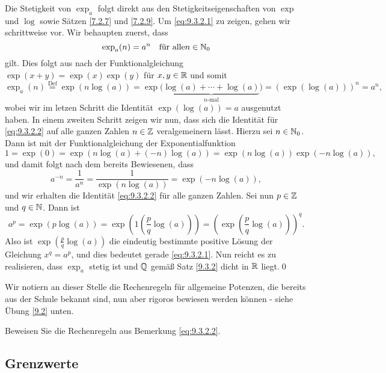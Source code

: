 \begin{subproof}[\ref{9.3.2}]
	Die Stetigkeit von $ \exp_a $ folgt direkt aus den Stetigkeitseigenschaften von $ \exp  $ und $ \log  $ sowie Sätzen \ref{7.2.7} und \ref{7.2.9}. Um \eqref{eq:9.3.2.1} zu zeigen, gehen wir schrittweise vor. Wir behaupten zuerst, dass
	\begin{equation}
		\label{eq:9.3.2.2}
		\exp_a(n) = a^n \quad \text{für alle} n \in \mathbb{N}_0
	\end{equation}
	gilt. Dies folgt aus nach der Funktionalgleichung $ \exp(x + y) = \exp(x) \exp (y) $ für $ x, y \in \mathbb{R}  $ und somit
	\[
		\exp_a(n) \overset{\text{Def}}{=}\exp (n \log (a)) = \exp \big( \underbrace{\log (a) + \dotsb + \log (a)}_{n\text{-mal} } \big) = \left( \exp (\log (a)) \right)^n = a^n,
	\]
	wobei wir im letzen Schritt die Identität $ \exp (\log (a)) = a $ ausgenutzt haben. In einem zweiten Schritt zeigen wir nun, dass sich die Identität für \eqref{eq:9.3.2.2} auf alle ganzen Zahlen $ n \in \mathbb{Z}  $ veralgemeinern lässt. Hierzu sei $ n \in \mathbb{N}_0 $. Dann ist mit der Funktionalgleichung der Exponentialfunktion
	\[
		1 = \exp (0) = \exp ( n \log (a) + (-n) \log (a)) = \exp (n\log (a))\exp (-n\log (a)),
	\]
	und damit folgt nach dem bereits Bewiesenen, dass
	\[
		a^{-n} = \frac{ 1 }{ a^{n}  } = \frac{ 1 }{ \exp (n \log (a)) } = \exp (-n\log (a)),
	\]
	und wir erhalten die Identität \eqref{eq:9.3.2.2} für alle ganzen Zahlen. Sei nun $ p \in \mathbb{Z} $ und $ q \in \mathbb{N}  $. Dann ist
	\[
		a^p =\exp \left( p \log (a) \right) = \exp \left( 1 \left( \frac{ p }{ q } \log (a) \right) \right) = \left( \exp \left( \frac{ p }{ q } \log (a) \right) \right)^q.
	\]
	Also ist $ \exp \left( \frac{ p }{ q } \log (a) \right)  $ die eindeutig bestimmte positive Lösung der Gleichung $ x^q = a^p $,
	und dies bedeutet gerade \eqref{eq:9.3.2.1}. Nun reicht es zu realisieren, dass $ \exp_a $ stetig ist und $ \mathbb{Q}  $ gemäß Satz \ref{9.3.2} dicht in $ \mathbb{R}  $ liegt.\qed
\end{subproof}

Wir notiern an dieser Stelle die Rechenregeln für allgemeine Potenzen, die bereits aus der Schule bekannt sind, nun aber rigoros bewiesen werden können - siehe Übung \ref{9.2} unten.

\begin{task}
	Beweisen Sie die Rechenregeln aus Bemerkung \eqref{eq:9.3.2.2}.
\end{task}



\subsection{Grenzwerte}

